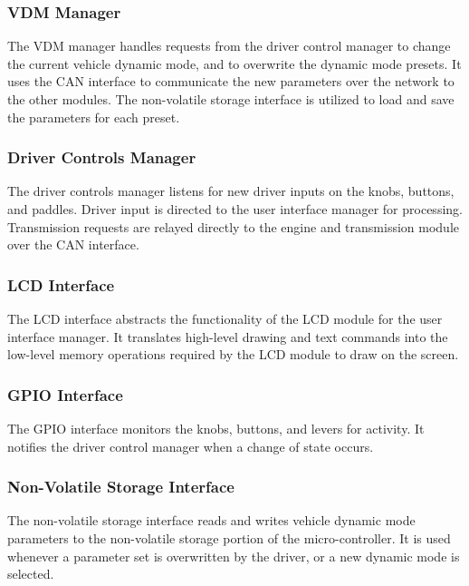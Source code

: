 \subsubsection{VDM Manager}

The VDM manager handles requests from the driver control manager to change the current vehicle dynamic mode, and to overwrite the dynamic mode presets. It uses the CAN interface to communicate the new parameters over the network to the other modules. The non-volatile storage interface is utilized to load and save the parameters for each preset. 

\subsubsection{Driver Controls Manager}

The driver controls manager listens for new driver inputs on the knobs, buttons, and paddles. Driver input is directed to the user interface manager for processing. Transmission requests are relayed directly to the engine and transmission module over the CAN interface.

\subsubsection{LCD Interface}

The LCD interface abstracts the functionality of the LCD module for the user interface manager. It translates high-level drawing and text commands into the low-level memory operations required by the LCD module to draw on the screen.

\subsubsection{GPIO Interface}

The GPIO interface monitors the knobs, buttons, and levers for activity. It notifies the driver control manager when a change of state occurs. 

\subsubsection{Non-Volatile Storage Interface}

The non-volatile storage interface reads and writes vehicle dynamic mode parameters to the non-volatile storage portion of the micro-controller. It is used whenever a parameter set is overwritten by the driver, or a new dynamic mode is selected.


